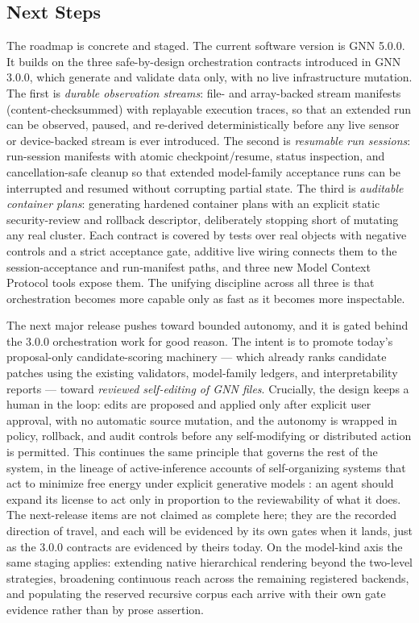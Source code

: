 \documentclass[
  english,
  9pt,
]{extarticle}
\begin{document}
\subsection{Next Steps}\label{next-steps}

The roadmap is concrete and staged. The current software version is GNN
5.0.0. It builds on the three safe-by-design orchestration contracts
introduced in GNN 3.0.0, which generate and validate data only, with no
live infrastructure mutation. The first is \emph{durable observation
streams}: file- and array-backed stream manifests (content-checksummed)
with replayable execution traces, so that an extended run can be
observed, paused, and re-derived deterministically before any live
sensor or device-backed stream is ever introduced. The second is
\emph{resumable run sessions}: run-session manifests with atomic
checkpoint/resume, status inspection, and cancellation-safe cleanup so
that extended model-family acceptance runs can be interrupted and
resumed without corrupting partial state. The third is \emph{auditable
container plans}: generating hardened container plans with an explicit
static security-review and rollback descriptor, deliberately stopping
short of mutating any real cluster. Each contract is covered by tests
over real objects with negative controls and a strict acceptance gate,
additive live wiring connects them to the session-acceptance and
run-manifest paths, and three new Model Context Protocol tools expose
them. The unifying discipline across all three is that orchestration
becomes more capable only as fast as it becomes more inspectable.

The next major release pushes toward bounded autonomy, and it is gated
behind the 3.0.0 orchestration work for good reason. The intent is to
promote today's proposal-only candidate-scoring machinery --- which
already ranks candidate patches using the existing validators,
model-family ledgers, and interpretability reports --- toward
\emph{reviewed self-editing of GNN files}. Crucially, the design keeps a
human in the loop: edits are proposed and applied only after explicit
user approval, with no automatic source mutation, and the autonomy is
wrapped in policy, rollback, and audit controls before any
self-modifying or distributed action is permitted. This continues the
same principle that governs the rest of the system, in the lineage of
active-inference accounts of self-organizing systems that act to
minimize free energy under explicit generative models
\citep{friston2010, parr2022}: an agent should expand its license to act
only in proportion to the reviewability of what it does. The
next-release items are not claimed as complete here; they are the
recorded direction of travel, and each will be evidenced by its own
gates when it lands, just as the 3.0.0 contracts are evidenced by theirs
today. On the model-kind axis the same staging applies: extending native
hierarchical rendering beyond the two-level strategies, broadening
continuous reach across the remaining registered backends, and
populating the reserved recursive corpus each arrive with their own gate
evidence rather than by prose assertion.
\end{document}

